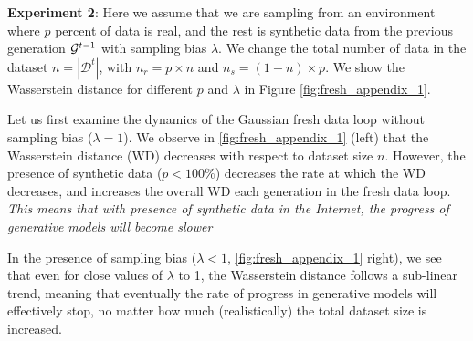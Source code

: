 \documentclass{article}
\def\bias{{\lambda}}
\def\colorFresh{colorC}
\def\fresh{\textcolor{\colorFresh}{fresh data loop}}
\begin{document}
\textbf{Experiment 2}: Here we assume that we are sampling from an environment where $p$ percent of data is real, and the rest is synthetic data from the previous generation $\mathcal{G}^{t-1}$ with sampling bias $\bias$. We change the total number of data in the dataset $n = |\mathcal{D}^t|$, with $n_r = p \times n$ and $n_s = (1-n) \times p$. We show the Wasserstein distance for different $p$ and $\bias$ in Figure \ref{fig:fresh_appendix_1}. 

Let us first examine the dynamics of the Gaussian \fresh{} without sampling bias ($\bias=1$). We observe in \cref{fig:fresh_appendix_1} (left) that the Wasserstein distance (WD) decreases with respect to dataset size $n$. However, the presence of synthetic data ($p < 100\%$) decreases the rate at which the WD decreases, and increases the overall WD each generation in the \fresh{}. \textit{This means that with presence of synthetic data in the Internet, the progress of generative models will become slower}

In the presence of sampling bias ($\bias<1$, \cref{fig:fresh_appendix_1} right), we see that even for close values of $\bias$ to 1, the Wasserstein distance follows a sub-linear trend, meaning that eventually the rate of progress in generative models will effectively stop, no matter how much (realistically) the total dataset size is increased.
\end{document}
